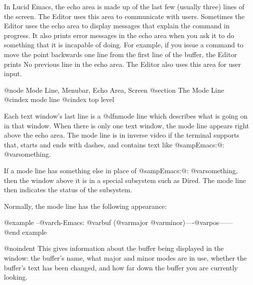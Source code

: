 In Lucid Emacs, the echo area is made up of the last few (usually three) lines of the 
screen. The Editor uses this area to communicate with users. 
Sometimes the Editor uses the echo area to display 
messages that explain the command in progress. It also prints error 
messages in the echo area when you ask it to do something that it is 
incapable of doing. For example, if you issue a command to move 
the point backwards one line from the first line of the buffer, the 
Editor prints No previous line in the echo area. The Editor also 
uses this area for user input.  

@node Mode Line, Menubar, Echo Area, Screen
@section The Mode Line
@cindex mode line
@cindex top level

  Each text window's last line is a @dfn{mode line} which describes what is
going on in that window.  When there is only one text window, the mode line
appears right above the echo area.  The mode line is in inverse video if
the terminal supports that, starts and ends with dashes, and contains text
like @samp{Emacs:@: @var{something}}.

  If a mode line has something else in place of @samp{Emacs:@: @var{something}},
then the window above it is in a special subsystem such as Dired.  The mode
line then indicates the status of the subsystem.

  Normally, the mode line has the following appearance:

@example
--@var{ch}-Emacs: @var{buf}      (@var{major} @var{minor})----@var{pos}------
@end example

@noindent
This gives information about the buffer being displayed in the window: the
buffer's name, what major and minor modes are in use, whether the buffer's
text has been changed, and how far down the buffer you are currently
looking.

